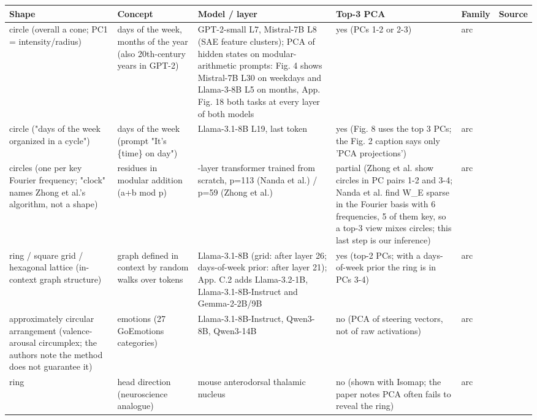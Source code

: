 {\scriptsize
\begin{longtable}{>{\raggedright\arraybackslash}p{3.0cm}>{\raggedright\arraybackslash}p{2.8cm}>{\raggedright\arraybackslash}p{3.4cm}>{\raggedright\arraybackslash}p{2.6cm}>{\raggedright\arraybackslash}p{1.3cm}>{\raggedright\arraybackslash}p{2.6cm}}
\toprule
\textbf{Shape} & \textbf{Concept} & \textbf{Model / layer} & \textbf{Top-3 PCA} & \textbf{Family} & \textbf{Source} \\
\midrule
\endhead
circle (overall a cone; PC1 = intensity/radius) & days of the week, months of the year (also 20th-century years in GPT-2) & GPT-2-small L7, Mistral-7B L8 (SAE feature clusters); PCA of hidden states on modular-arithmetic prompts: Fig. 4 shows Mistral-7B L30 on weekdays and Llama-3-8B L5 on months, App. Fig. 18 both tasks at every layer of both models & yes (PCs 1-2 or 2-3) & arc & \citet{engels2025notall} \\
circle ("days of the week organized in a cycle") & days of the week (prompt "It's \{time\} on day") & Llama-3.1-8B L19, last token & yes (Fig. 8 uses the top 3 PCs; the Fig. 2 caption says only 'PCA projections') & arc & \citet{bhalla2026sae} \\
circles (one per key Fourier frequency; "clock" names Zhong et al.'s algorithm, not a shape) & residues in modular addition (a+b mod p) & 1-layer transformer trained from scratch, p=113 (Nanda et al.) / p=59 (Zhong et al.) & partial (Zhong et al. show circles in PC pairs 1-2 and 3-4; Nanda et al. find W\_E sparse in the Fourier basis with 6 frequencies, 5 of them key, so a top-3 view mixes circles; this last step is our inference) & arc & \citet{nanda2023progress,zhong2023clock} \\
ring / square grid / hexagonal lattice (in-context graph structure) & graph defined in context by random walks over tokens & Llama-3.1-8B (grid: after layer 26; days-of-week prior: after layer 21); App. C.2 adds Llama-3.2-1B, Llama-3.1-8B-Instruct and Gemma-2-2B/9B & yes (top-2 PCs; with a days-of-week prior the ring is in PCs 3-4) & arc & \citet{park2025iclr} \\
approximately circular arrangement (valence-arousal circumplex; the authors note the method does not guarantee it) & emotions (27 GoEmotions categories) & Llama-3.1-8B-Instruct, Qwen3-8B, Qwen3-14B & no (PCA of steering vectors, not of raw activations) & arc & \citet{sun2026valence} \\
ring & head direction (neuroscience analogue) & mouse anterodorsal thalamic nucleus & no (shown with Isomap; the paper notes PCA often fails to reveal the ring) & arc & \citet{chaudhuri2019ring} \\

\end{longtable}}
